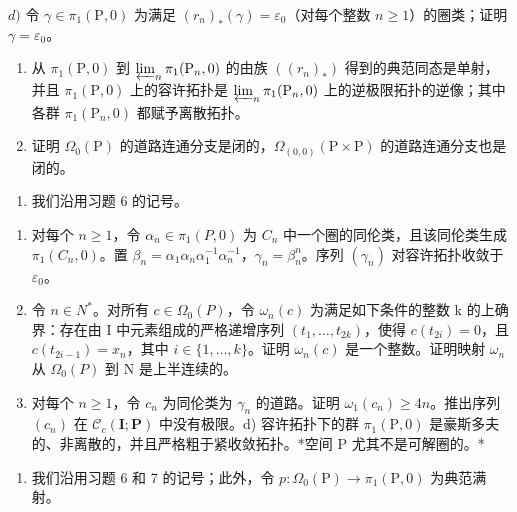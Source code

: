 \(d)\) 令 \(\gamma \in \pi_1(\mathrm{P},0)\) 为满足 \((r_n)_*(\gamma) = \varepsilon_0\)（对每个整数 \(n \geqslant 1\)）的圈类；证明 \(\gamma = \varepsilon_0\)。

\begin{enumerate}
\def\labelenumi{\alph{enumi})}
\setcounter{enumi}{4}
\item
  从 \(\pi_1(\mathrm{P},0)\) 到 \(\varprojlim_{n}\pi_{1}(\mathrm{P}_{n},0)\) 的由族 \(((r_n)_*)\) 得到的典范同态是单射，并且 \(\pi_1(\mathrm{P},0)\) 上的容许拓扑是 \(\varprojlim_{n}\pi_{1}(\mathrm{P}_{n},0)\) 上的逆极限拓扑的逆像；其中各群 \(\pi_1(\mathrm{P}_n,0)\) 都赋予离散拓扑。
\item
  证明 \(\Omega_{0}(\mathrm{P})\) 的道路连通分支是闭的，\(\Omega_{(0,0)}(\mathrm{P} \times \mathrm{P})\) 的道路连通分支也是闭的。
\end{enumerate}

\begin{enumerate}
\def\labelenumi{\arabic{enumi})}
\setcounter{enumi}{6}
\tightlist
\item
  我们沿用习题 6 的记号。
\end{enumerate}

\begin{enumerate}
\def\labelenumi{\alph{enumi})}
\item
  对每个 \(n \geqslant 1\)，令 \(\alpha_{n} \in \pi_{1}(P,0)\) 为 \(C_{n}\) 中一个圈的同伦类，且该同伦类生成 \(\pi_{1}(C_{n},0)\)。置 \(\beta_{n} = \alpha_{1}\alpha_{n}\alpha_{1}^{-1}\alpha_{n}^{-1}\)，\(\gamma_{n} = \beta_{n}^{n}\)。序列 \((\gamma_{n})\) 对容许拓扑收敛于 \(\varepsilon_{0}\)。
\item
  令 \(n \in N^{*}\)。对所有 \(c \in \Omega_{0}(P)\)，令 \(\omega_{n}(c)\) 为满足如下条件的整数 k 的上确界：存在由 I 中元素组成的严格递增序列 \((t_{1}, \ldots, t_{2k})\)，使得 \(c(t_{2i}) = 0\)，且 \(c(t_{2i-1}) = x_{n}\)，其中 \(i \in \{1, \ldots, k\}\)。证明 \(\omega_{n}(c)\) 是一个整数。证明映射 \(\omega_{n}\) 从 \(\Omega_{0}(P)\) 到 N 是上半连续的。
\item
  对每个 \(n \geqslant 1\)，令 \(c_{n}\) 为同伦类为 \(\gamma_{n}\) 的道路。证明 \(\omega_{1}(c_{n}) \geqslant 4n\)。推出序列 \((c_{n})\) 在 \(\mathcal{C}_{c}(\mathbf{I};\mathbf{P})\) 中没有极限。d) 容许拓扑下的群 \(\pi_{1}(\mathrm{P},0)\) 是豪斯多夫的、非离散的，并且严格粗于紧收敛拓扑。*空间 P 尤其不是可解圈的。*
\end{enumerate}

\begin{enumerate}
\def\labelenumi{\arabic{enumi})}
\setcounter{enumi}{7}
\tightlist
\item
  我们沿用习题 6 和 7 的记号；此外，令 \(p\colon \Omega_{0}(\mathrm{P})\to\pi_1(\mathrm{P},0)\) 为典范满射。
\end{enumerate}

